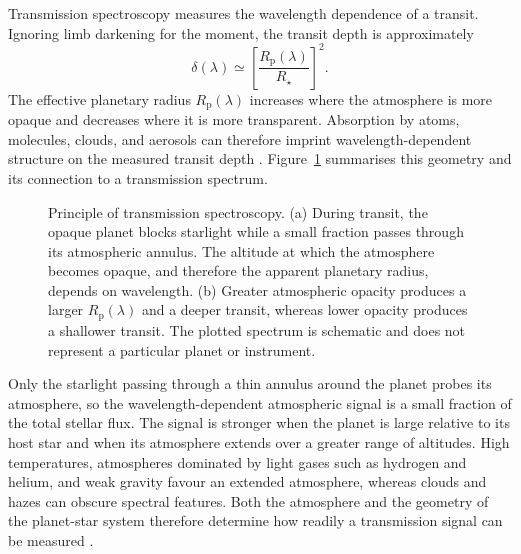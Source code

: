 Transmission spectroscopy measures the wavelength dependence of a transit.
Ignoring limb darkening for the moment, the transit depth is approximately
\begin{equation}
  \delta(\lambda) \simeq
  \left[\frac{R_{\mathrm p}(\lambda)}{R_\star}\right]^2 .
  \label{eq:transit-depth}
\end{equation}
The effective planetary radius $R_{\mathrm p}(\lambda)$ increases where the
atmosphere is more opaque and decreases where it is more transparent.
Absorption by atoms, molecules, clouds, and aerosols can therefore imprint
wavelength-dependent structure on the measured transit depth
\citep{SeagerSasselov2000,Brown2001}. Figure~\ref{fig:transmission-spectroscopy}
summarises this geometry and its connection to a transmission spectrum.

\begin{figure}[t]
  \centering
  
  \caption{Principle of transmission spectroscopy. (a) During transit, the
  opaque planet blocks starlight while a small fraction passes through its
  atmospheric annulus. The altitude at which the atmosphere becomes opaque,
  and therefore the apparent planetary radius, depends on wavelength.
  (b) Greater atmospheric opacity produces a larger $R_{\mathrm p}(\lambda)$
  and a deeper transit, whereas lower opacity produces a shallower transit.
  The plotted spectrum is schematic and does not represent a particular planet
  or instrument.}
  \label{fig:transmission-spectroscopy}
\end{figure}

Only the starlight passing through a thin annulus around the planet probes its
atmosphere, so the wavelength-dependent atmospheric signal is a small fraction
of the total stellar flux. The signal is stronger when the planet is large
relative to its host star and when its atmosphere extends over a greater range
of altitudes. High temperatures, atmospheres dominated by light gases such as
hydrogen and helium, and weak gravity favour an extended atmosphere, whereas
clouds and hazes can obscure spectral features. Both the atmosphere and the
geometry of the planet-star system therefore determine how readily a
transmission signal can be measured \citep{SeagerSasselov2000,Brown2001}.

